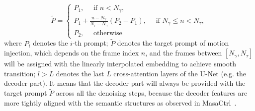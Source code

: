 \begin{equation}
\widetilde{P}=\left\{\begin{array}{l}
P_1, \quad \text { if } n < N_{\gamma}, \\
P_1 + \frac{n - N_{\gamma}}{N_{\tau} - N_{\gamma}}(P_2 - P_1), \quad \text { if } N_{\gamma} \leq n < N_{\tau}, \\
P_2, \quad \text { otherwise }
\end{array}\right.
\end{equation}
where ${P_i}$ denotes the $i$-th prompt; $\widetilde{P}$ denotes the target prompt of motion injection, which depends on the frame index $n$, and the frames between $[N_{\gamma},N_{\tau}]$ will be assigned with the linearly interpolated embedding to achieve smooth transition; $l > L$ denotes the last $L$ cross-attention layers of the U-Net (e.g. the decoder part). It means that the decoder part will always be provided with the target prompt $\widetilde{P}$ across all the denoising steps, because the decoder features are more tightly aligned with the semantic structures as observed in MasaCtrl~\citep{cao2023masactrl}.
